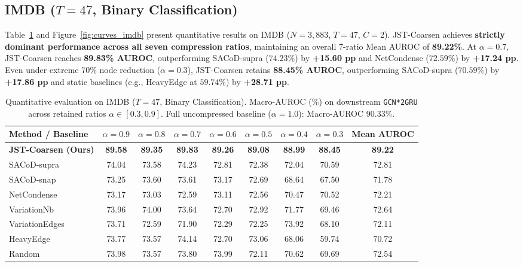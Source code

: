 \documentclass[sigconf]{acmart}
\begin{document}
\subsection{IMDB ($T=47$, Binary Classification)}
\label{sec:imdb}
Table~\ref{tab:imdb} and Figure~\ref{fig:curves_imdb} present quantitative results on IMDB ($N=3,883$, $T=47$, $C=2$). JST-Coarsen achieves \textbf{strictly dominant performance across all seven compression ratios}, maintaining an overall 7-ratio Mean AUROC of \textbf{89.22\%}. At $\alpha = 0.7$, JST-Coarsen reaches \textbf{89.83\% AUROC}, outperforming SACoD-supra ($74.23\%$) by \textbf{+15.60 pp} and NetCondense ($72.59\%$) by \textbf{+17.24 pp}. Even under extreme 70\% node reduction ($\alpha = 0.3$), JST-Coarsen retains \textbf{88.45\% AUROC}, outperforming SACoD-supra ($70.59\%$) by \textbf{+17.86 pp} and static baselines (e.g., HeavyEdge at $59.74\%$) by \textbf{+28.71 pp}.

\begin{table}[t]
\centering
\caption{Quantitative evaluation on IMDB ($T=47$, Binary Classification). Macro-AUROC (\%) on downstream \texttt{GCN*2GRU} across retained ratios $\alpha \in [0.3, 0.9]$. Full uncompressed baseline ($\alpha = 1.0$): Macro-AUROC 90.33\%.}
\label{tab:imdb}
\small
\begin{tabular*}{\textwidth}{@{\extracolsep{\fill}}lcccccccc@{}}
\toprule
\textbf{Method / Baseline} & $\alpha = 0.9$ & $\alpha = 0.8$ & $\alpha = 0.7$ & $\alpha = 0.6$ & $\alpha = 0.5$ & $\alpha = 0.4$ & $\alpha = 0.3$ & \textbf{Mean AUROC} \\
\midrule
\textbf{JST-Coarsen (Ours)} & \textbf{89.58} & \textbf{89.35} & \textbf{89.83} & \textbf{89.26} & \textbf{89.08} & \textbf{88.99} & \textbf{88.45} & \textbf{89.22} \\
SACoD-supra~\cite{sacod2026} & 74.04 & 73.58 & 74.23 & 72.81 & 72.38 & 72.04 & 70.59 & 72.81 \\
SACoD-snap~\cite{sacod2026}  & 73.25 & 73.60 & 73.61 & 73.17 & 72.69 & 68.64 & 67.50 & 71.78 \\
NetCondense~\cite{liu2022graph} & 73.17 & 73.03 & 72.59 & 73.11 & 72.56 & 70.47 & 70.52 & 72.21 \\
VariationNb~\cite{loukas2019graph} & 73.96 & 74.00 & 73.64 & 72.70 & 72.92 & 71.77 & 69.46 & 72.64 \\
VariationEdges~\cite{loukas2019graph} & 73.71 & 72.59 & 71.90 & 72.29 & 72.25 & 73.92 & 68.10 & 72.11 \\
HeavyEdge~\cite{dhillon2007weighted}  & 73.77 & 73.57 & 74.14 & 72.70 & 73.06 & 68.06 & 59.74 & 70.72 \\
Random~\cite{loukas2019graph}     & 73.98 & 73.57 & 73.80 & 73.99 & 72.11 & 70.62 & 69.69 & 72.54 \\
\bottomrule
\end{tabular*}
\end{table}
\end{document}
